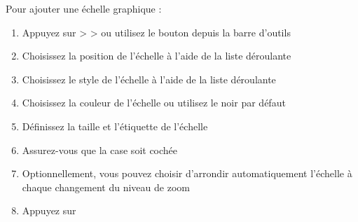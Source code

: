Pour ajouter une échelle graphique :

\begin{enumerate}
\item Appuyez sur  >  >  ou utilisez le bouton  depuis la barre d'outils
\item Choisissez la position de l'échelle à l'aide de la liste déroulante\\ 
\item Choisissez le style de l'échelle à l'aide de la liste déroulante\\ 
\item Choisissez la couleur de l'échelle  ou utilisez le noir par défaut
\item Définissez la taille et l'étiquette de l'échelle 
\item Assurez-vous que la case  soit cochée
\item Optionnellement, vous pouvez choisir d'arrondir automatiquement l'échelle 
  à chaque changement du niveau de zoom 
\item Appuyez sur  
\end{enumerate} 


